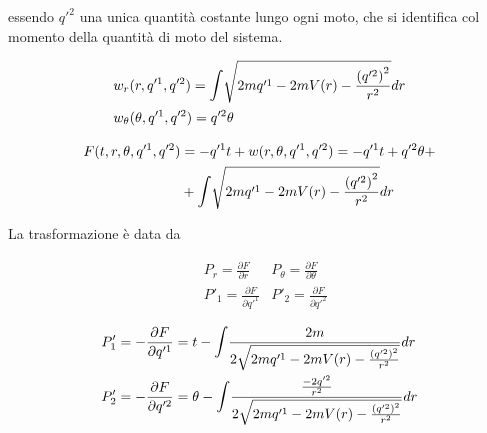 essendo $ q'^2 $ una unica quantità costante lungo ogni moto, che si identifica col momento della quantità di moto del sistema.

\begin{equation*}
\begin{split}
& w_r (r, q'^1, q'^2) = \mathlarger{\int} \sqrt{2m q'^1 - 2m V(r) -\frac{\left( q'^2 \right)^2}{r^2}} dr \\
& w_\theta (\theta, q'^1, q'^2) = q'^2 \theta
\end{split}
\end{equation*}

\begin{align*}
F (t, r, \theta, q'^1, q'^2) &= - q'^1 t + w (r, \theta, q'^1, q'^2) = - q'^1 t + q'^2 \theta +
\\
&+ \mathlarger{\int} \sqrt{2m q'^1 - 2m V(r) - \frac{\left( q'^2 \right)^2}{r^2}} dr
\end{align*}

La trasformazione è data da

\begin{align*}
& P_r = \frac{\partial F}{\partial r} & P_\theta = \frac{\partial F}{\partial \theta}
\\
& P'_1 = \frac{\partial F}{\partial q'^1} & P'_2 = \frac{\partial F}{\partial q'^2}
\end{align*}

\begin{equation*}
\begin{split}
& P'_1 = - \frac{\partial F}{\partial q'^1} = t - \mathlarger{\int} \frac{2m}{2 \sqrt{2m q'^1 - 2m V(r) - \frac{\left( q'^2 \right)^2}{r^2}}}dr \\
& P'_2 = - \frac{\partial F}{\partial q'^2} = \theta - \mathlarger{\int} \frac{ \frac{- 2 q'^2}{r^2} }{2 \sqrt{2m q'^1 - 2m V(r) - \frac{\left( q'^2 \right)^2}{r^2}}}dr
\end{split}
\end{equation*}


